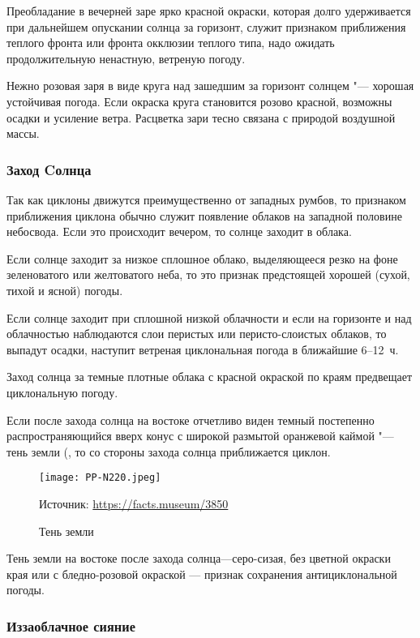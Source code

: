  Преобладание в вечерней заре ярко красной окраски, которая
долго удерживается при дальнейшем опускании солнца за горизонт, служит
признаком приближения теплого фронта или фронта окклюзии теплого типа,
надо ожидать продолжительную ненастную, ветреную погоду.

 Нежно розовая заря в виде круга над зашедшим за горизонт солнцем
"--- хорошая устойчивая погода. Если окраска круга становится розово
красной, возможны осадки и усиление ветра. Расцветка зари тесно
связана с природой воздушной массы.

\subsubsection{Заход Cолнца}

Так как циклоны движутся преимущественно от западных румбов, то
признаком приближения циклона обычно служит появление облаков на
западной половине небосвода. Если это происходит вечером, то солнце
заходит в облака.

 Если солнце заходит за низкое сплошное облако, выделяющееся
резко на фоне зеленоватого или желтоватого неба, то это признак
предстоящей хорошей (сухой, тихой и ясной) погоды.

 Если солнце заходит при сплошной низкой облачности и если на
горизонте и над облачностью наблюдаются слои перистых или
перисто-слоистых облаков, то выпадут осадки, наступит ветреная
циклональная погода в ближайшие 6--12~ч.

 Заход солнца за темные плотные облака с красной окраской по
краям предвещает циклональную погоду.

 Если после захода солнца на востоке отчетливо виден темный
постепенно распространяющийся вверх конус с широкой размытой оранжевой
каймой "--- тень земли (, то со стороны захода солнца
приближается циклон.

\begin{figure}[htb]
  \centering{}
  \texttt{[image: PP-N220.jpeg]}
  \caption{Тень земли}
  \label{fig:pp-n220}
  \scriptsize
  \centering{}Источник: \url{https://facts.museum/3850}
\end{figure}

 Тень земли на востоке после захода солнца—серо-сизая, без цветной
окраски края или с бледно-розовой окраской — признак сохранения
антициклональной погоды.

\subsubsection{Иззаоблачное сияние}

